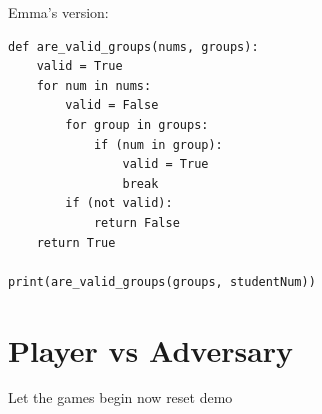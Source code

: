 \documentclass[twocolumn, 10pt]{article}
\begin{document}
Emma's version:

\footnotesize
\begin{verbatim}
def are_valid_groups(nums, groups):
    valid = True
    for num in nums:
        valid = False
        for group in groups:
            if (num in group): 
                valid = True
                break
        if (not valid):
            return False
    return True

print(are_valid_groups(groups, studentNum))
\end{verbatim}
\normalsize

\section{Player vs Adversary}
Let the games begin now reset demo
\end{document}
